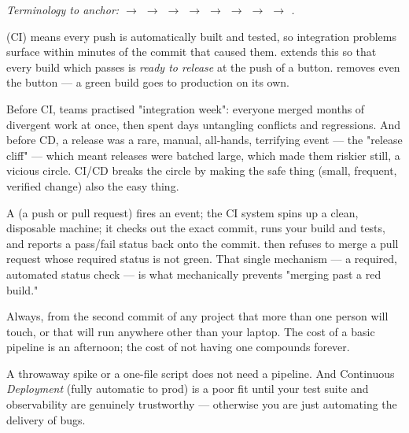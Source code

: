 \begin{center}\small\itshape\color{cInk!70}
Terminology to anchor:  $\rightarrow$  $\rightarrow$  $\rightarrow$  $\rightarrow$  $\rightarrow$  $\rightarrow$  $\rightarrow$  $\rightarrow$ .
\end{center}



  (CI) means every push is automatically built and tested, so integration problems surface within minutes of the commit that caused them.  extends this so that every build which passes is \emph{ready to release} at the push of a button.  removes even the button --- a green build goes to production on its own.

 Before CI, teams practised "integration week": everyone merged months of divergent work at once, then spent days untangling conflicts and regressions. And before CD, a release was a rare, manual, all-hands, terrifying event --- the "release cliff" --- which meant releases were batched large, which made them riskier still, a vicious circle. CI/CD breaks the circle by making the safe thing (small, frequent, verified change) also the easy thing.

 A  (a push or pull request) fires an event; the CI system spins up a clean, disposable machine; it checks out the exact commit, runs your build and tests, and reports a pass/fail status back onto the commit.  then refuses to merge a pull request whose required status is not green. That single mechanism --- a required, automated status check --- is what mechanically prevents "merging past a red build."

 Always, from the second commit of any project that more than one person will touch, or that will run anywhere other than your laptop. The cost of a basic pipeline is an afternoon; the cost of not having one compounds forever.

 A throwaway spike or a one-file script does not need a pipeline. And Continuous \emph{Deployment} (fully automatic to prod) is a poor fit until your test suite and observability are genuinely trustworthy --- otherwise you are just automating the delivery of bugs.

